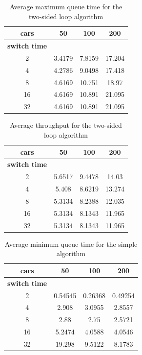 \documentclass[a4paper,11pt]{article}
\begin{document}
\begin{table}[htb]
\centering
\begin{tabular}{cccc}
\hline
\textbf{cars} & 50 & 100 & 200\\
\hline
\textbf{switch time} & & & \\
2 & 3.4179 & 7.8159 & 17.204 \\
4 & 4.2786 & 9.0498 & 17.418 \\
8 & 4.6169 & 10.751 & 18.97 \\
16 & 4.6169 & 10.891 & 21.095 \\
32 & 4.6169 & 10.891 & 21.095 \\
\hline
\end{tabular}
\label{tab:twoloopmaxtime}
\caption{Average maximum queue time for the two-sided loop algorithm}
\end{table}

\begin{table}[htb]
\centering
\begin{tabular}{cccc}
\hline
\textbf{cars} & 50 & 100 & 200\\
\hline
\textbf{switch time} & & & \\
2 & 5.6517 & 9.4478 & 14.03 \\
4 & 5.408 & 8.6219 & 13.274 \\
8 & 5.3134 & 8.2388 & 12.035 \\
16 & 5.3134 & 8.1343 & 11.965 \\
32 & 5.3134 & 8.1343 & 11.965 \\
\hline
\end{tabular}
\label{tab:twoloopmcars}
\caption{Average throughput for the two-sided loop algorithm}
\end{table}

\begin{table}[htb]
\centering
\begin{tabular}{cccc}
\hline
\textbf{cars} & 50 & 100 & 200\\
\hline
\textbf{switch time} & & & \\
2 & 0.54545 & 0.26368 & 0.49254 \\
4 & 2.908 & 3.0955 & 2.8557 \\
8 & 2.88 & 2.75 & 2.5721 \\
16 & 5.2474 & 4.0588 & 4.0546 \\
32 & 19.298 & 9.5122 & 8.1783 \\
\hline
\end{tabular}
\label{tab:simplemintime}
\caption{Average minimum queue time for the simple algorithm}
\end{table}
\end{document}
